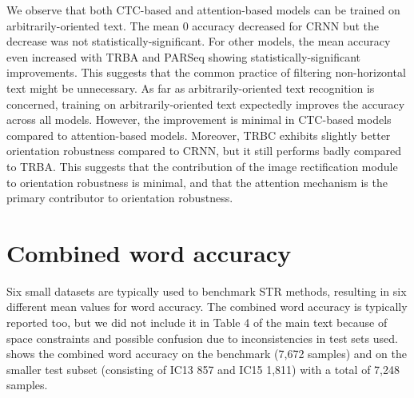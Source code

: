 We observe that both CTC-based and attention-based models can be trained on arbitrarily-oriented text. The mean 0\textdegree{} accuracy decreased for CRNN but the decrease was not statistically-significant. For other models, the mean accuracy even increased with TRBA and PARSeq showing statistically-significant improvements. This suggests that the common practice of filtering non-horizontal text might be unnecessary. As far as arbitrarily-oriented text recognition is concerned, training on arbitrarily-oriented text expectedly improves the accuracy across all models. However, the improvement is minimal in CTC-based models compared to attention-based models. Moreover, TRBC exhibits slightly better orientation robustness compared to CRNN, but it still performs badly compared to TRBA. This suggests that the contribution of the image rectification module to orientation robustness is minimal, and that the attention mechanism is the primary contributor to orientation robustness.


\section{Combined word accuracy}

Six small datasets are typically used to benchmark STR methods, resulting in six different mean values for word accuracy. The combined word accuracy is typically reported too, but we did not include it in Table 4 of the main text because of space constraints and possible confusion due to inconsistencies in test sets used.  shows the combined word accuracy on the benchmark (7,672 samples) and on the smaller test subset (consisting of IC13 857 and IC15 1,811) with a total of 7,248 samples.

